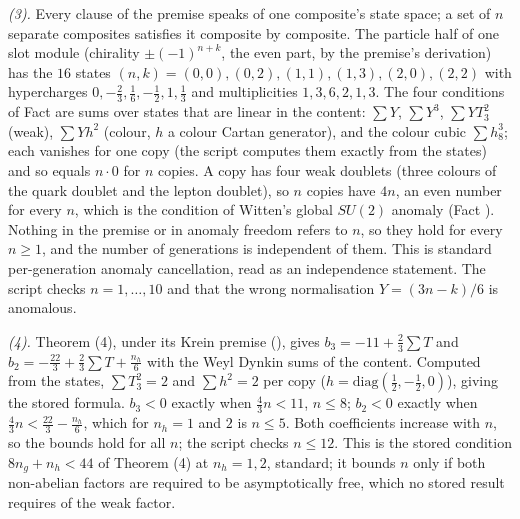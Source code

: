 \emph{(3).} Every clause of the premise speaks of one composite's state space; a set of $n$ separate composites satisfies it composite by composite. The particle half of one slot module (chirality $\pm(-1)^{n + k}$, the even part, by the premise's derivation) has the $16$ states $(n, k) = (0,0), (0,2), (1,1), (1,3), (2,0), (2,2)$ with hypercharges $0, -\tfrac23, \tfrac16, -\tfrac12, 1, \tfrac13$ and multiplicities $1, 3, 6, 2, 1, 3$. The four conditions of Fact  are sums over states that are linear in the content: $\sum Y$, $\sum Y^{3}$, $\sum Y T_{3}^{2}$ (weak), $\sum Y h^{2}$ (colour, $h$ a colour Cartan generator), and the colour cubic $\sum h_{8}^{3}$; each vanishes for one copy (the script computes them exactly from the states) and so equals $n \cdot 0$ for $n$ copies. A copy has four weak doublets (three colours of the quark doublet and the lepton doublet), so $n$ copies have $4n$, an even number for every $n$, which is the condition of Witten's global $SU(2)$ anomaly (Fact ). Nothing in the premise or in anomaly freedom refers to $n$, so they hold for every $n \ge 1$, and the number of generations is independent of them. This is standard per-generation anomaly cancellation, read as an independence statement. The script checks $n = 1, \dots, 10$ and that the wrong normalisation $Y = (3n - k)/6$ is anomalous.

\emph{(4).} Theorem (4), under its Krein premise (), gives $b_{3} = -11 + \tfrac23\sum T$ and $b_{2} = -\tfrac{22}{3} + \tfrac23\sum T + \tfrac{n_{h}}{6}$ with the Weyl Dynkin sums of the content. Computed from the states, $\sum T_{3}^{2} = 2$ and $\sum h^{2} = 2$ per copy ($h = \mathrm{diag}(\tfrac12, -\tfrac12, 0)$), giving the stored formula. $b_{3} < 0$ exactly when $\tfrac43 n < 11$, $n \le 8$; $b_{2} < 0$ exactly when $\tfrac43 n < \tfrac{22}{3} - \tfrac{n_{h}}{6}$, which for $n_{h} = 1$ and $2$ is $n \le 5$. Both coefficients increase with $n$, so the bounds hold for all $n$; the script checks $n \le 12$. This is the stored condition $8n_{g} + n_{h} < 44$ of Theorem (4) at $n_{h} = 1, 2$, standard; it bounds $n$ only if both non-abelian factors are required to be asymptotically free, which no stored result requires of the weak factor.

